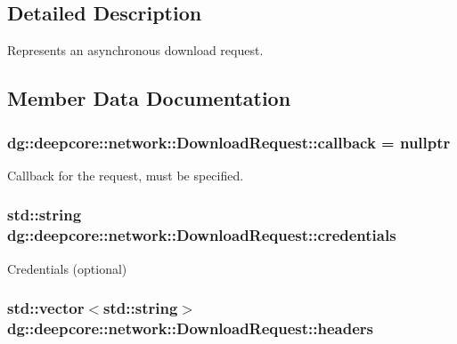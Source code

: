 \subsection{Detailed Description}
Represents an asynchronous download request. 

\subsection{Member Data Documentation}
\subsubsection[{\texorpdfstring{callback}{callback}}]{ dg\+::deepcore\+::network\+::\+Download\+Request\+::callback = nullptr}\hypertarget{structdg_1_1deepcore_1_1network_1_1_download_request_adb453a945c53898c25e110d81c0d2369}{}\label{structdg_1_1deepcore_1_1network_1_1_download_request_adb453a945c53898c25e110d81c0d2369}


Callback for the request, must be specified. 

\subsubsection[{\texorpdfstring{credentials}{credentials}}]{\setlength{\rightskip}{0pt plus 5cm}std\+::string dg\+::deepcore\+::network\+::\+Download\+Request\+::credentials}\hypertarget{structdg_1_1deepcore_1_1network_1_1_download_request_a658bf11041a4e59708e11a03586a3cc8}{}\label{structdg_1_1deepcore_1_1network_1_1_download_request_a658bf11041a4e59708e11a03586a3cc8}


Credentials (optional) 

\subsubsection[{\texorpdfstring{headers}{headers}}]{\setlength{\rightskip}{0pt plus 5cm}std\+::vector$<$std\+::string$>$ dg\+::deepcore\+::network\+::\+Download\+Request\+::headers}\hypertarget{structdg_1_1deepcore_1_1network_1_1_download_request_a155aa5c32169a6bf6d47fec321672f4e}{}\label{structdg_1_1deepcore_1_1network_1_1_download_request_a155aa5c32169a6bf6d47fec321672f4e}


